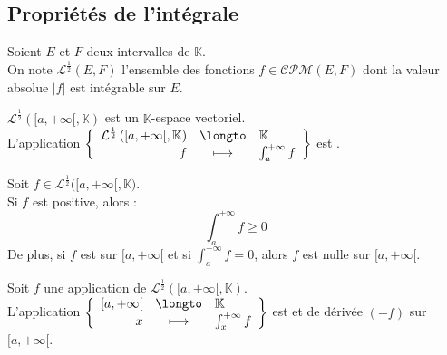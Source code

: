 \documentclass[11pt,a4paper,fleqn,pdftex]{report}
\begin{document}
\subsection{Propriétés de l'intégrale} %
\label{sub:proprietes_integrale}
\begin{dfn}
     Soient $E$ et $F$ deux intervalles de $\mathbb{K}$.\\
     On note $\mathcal{L}^\frac{1}{2}(E,F)$ l'ensemble des fonctions $f \in \mathcal{CPM}(E,F)$ dont la valeur absolue $|f|$ est intégrable sur $E$.
\end{dfn}
\begin{theorem}
    \label{thm:integration_linearite}
     $\mathcal{L}^\frac{1}{2}\left( [a,+\infty [,\mathbb{K} \right)$ est un $\mathbb{K}$-espace vectoriel.\\
     L'application $\left\lbrace \begin{array}{r c l}\mathcal{L}^\frac{1}{2}\left( [a,+\infty [,\mathbb{K} \right) &\longto &\mathbb{K}\\f&\longmapsto &\int_a^{+\infty} f\end{array} \right\rbrace$ est .
\end{theorem}
\begin{theorem}[Positivité]
    \label{thm:integration_positivite}
     Soit $f \in \mathcal{L}^\frac{1}{2}\bigg( [a,+\infty [,\mathbb{K}\bigg)$.\\
     Si $f$ est positive, alors : 
     \begin{equation}
     \int_a^{+\infty} f \ge 0
     \end{equation}
     De plus, si $f$ est  sur $[a,+\infty[$ et si $\int_a^{+\infty} f = 0$, alors $f$ est nulle sur $[a,+\infty[$.
\end{theorem}
\begin{theorem}[Dérivation]
     Soit $f$ une application  de $\mathcal{L}^\frac{1}{2}\left( [a,+\infty [,\mathbb{K}\right)$.\\
     L'application $\left\lbrace \begin{array}{r c l} [a,+\infty [ &\longto &\mathbb{K}\\x&\longmapsto &\int_x^{+\infty} f\end{array} \right\rbrace$ est  et de dérivée $(-f)$ sur $[a,+\infty [$.
\end{theorem}
\end{document}
